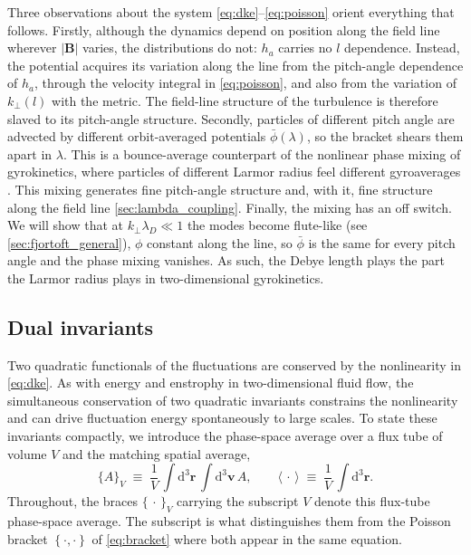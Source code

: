 \documentclass{jpp}
\newcommand{\rmd}{\text{d}}
\newcommand{\bv}{\mathbf{v}}
\newcommand{\br}{\mathbf{r}}
\newcommand{\bB}{\mathbf{B}}
\newcommand{\kperp}{k_\perp}
\newcommand{\pbra}[2]{\left\lbrace #1, #2 \right\rbrace}
\newcommand{\lambdaD}{\lambda_D}
\begin{document}
Three observations about the system \cref{eq:dke}--\cref{eq:poisson} orient everything that follows. Firstly, although the dynamics depend on position along the field line wherever $|\bB|$ varies, the distributions do not: $h_a$ carries no $l$ dependence. Instead, the potential acquires its variation along the line from the pitch-angle dependence of $h_a$, through the velocity integral in \cref{eq:poisson}, and also from the variation of $\kperp(l)$ with the metric. The field-line structure of the turbulence is therefore slaved to its pitch-angle structure. Secondly, particles of different pitch angle are advected by different orbit-averaged potentials $\bar\phi(\lambda)$, so the bracket shears them apart in $\lambda$. This is a bounce-average counterpart of the nonlinear phase mixing of gyrokinetics, where particles of different Larmor radius feel different gyroaverages \citep{Dorland1993, Schekochihin2008}. This mixing generates fine pitch-angle structure and, with it, fine structure along the field line \cref{sec:lambda_coupling}. Finally, the mixing has an off switch. We will show that at $\kperp\lambdaD \ll 1$ the modes become flute-like (see \cref{sec:fjortoft_general}), $\phi$ constant along the line, so $\bar\phi$ is the same for every pitch angle and the phase mixing vanishes. As such, the Debye length plays the part the Larmor radius plays in two-dimensional gyrokinetics. 

\subsection{Dual invariants}\label{sec:invariants}

Two quadratic functionals of the fluctuations are conserved by the nonlinearity in \cref{eq:dke}. As with energy and enstrophy in two-dimensional fluid flow, the simultaneous conservation of two quadratic invariants constrains the nonlinearity and can drive fluctuation energy spontaneously to large scales. To state these invariants compactly, we introduce the phase-space average over a flux tube of volume $V$ and the matching spatial average,
\begin{equation}\label{eq:psave_def}
\bigl\{ A \bigr\}_{\!{\scriptscriptstyle V}} \;\equiv\; \frac{1}{V}\, \int \rmd^3 \br\, \int \rmd^3 \bv\, A,
\qquad
\langle\, \cdot\, \rangle \;\equiv\; \frac{1}{V}\, \int \rmd^3 \br .
\end{equation}
Throughout, the braces $\{\,\cdot\,\}_{\scriptscriptstyle V}$ carrying the subscript $V$ denote this flux-tube phase-space average. The subscript is what distinguishes them from the Poisson bracket $\pbra{\cdot}{\cdot}$ of \cref{eq:bracket} where both appear in the same equation.
\end{document}
